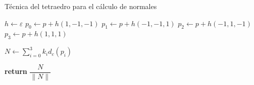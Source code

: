 \begin{algorithm}[H]
    \caption{Técnica del tetraedro para el cálculo de normales} \label{alg:normal-tetraedro}
    \begin{algorithmic}
    \State $h\gets\varepsilon$
    \State $p_0 \gets p + h(1,-1,-1)$
    \State $p_1 \gets p + h(-1,-1,1)$
    \State $p_2 \gets p + h(-1,1,-1)$
    \State $p_3 \gets p + h(1,1,1)$

    \State $N\gets \sum_{i=0}^3 k_i d_c(p_i)$

    \State \textbf{return} $\dfrac{N}{\|N\|}$
    \end{algorithmic}
\end{algorithm}

